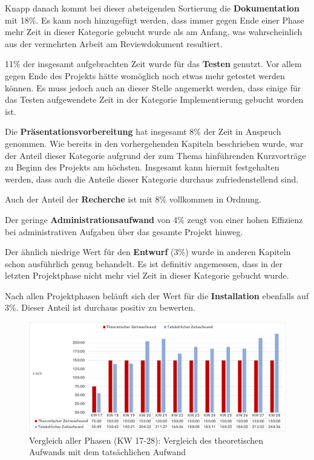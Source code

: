 \documentclass[../review_3.tex]{subfiles}
\begin{document}
Knapp danach kommt bei dieser absteigenden Sortierung die \textbf{Dokumentation} mit 18\%. Es kann noch hinzugefügt werden, dass immer gegen Ende einer Phase mehr Zeit in dieser Kategorie gebucht wurde als am Anfang, was wahrscheinlich aus der vermehrten Arbeit am Reviewdokument resultiert.

11\% der insgesamt aufgebrachten Zeit wurde für das \textbf{Testen} genutzt. Vor allem gegen Ende des Projekts hätte womöglich noch etwas mehr getestet werden können. Es muss jedoch auch an dieser Stelle angemerkt werden, dass einige für das Testen aufgewendete Zeit in der Kategorie Implementierung gebucht worden ist.

Die \textbf{Präsentationsvorbereitung} hat insgesamt 8\% der Zeit in Anspruch genommen. Wie bereits in den vorhergehenden Kapiteln beschrieben wurde, war der Anteil dieser Kategorie aufgrund der zum Thema hinführenden Kurzvorträge zu Beginn des Projekts am höchsten. Insgesamt kann hiermit festgehalten werden, dass auch die Anteile dieser Kategorie durchaus zufriedenstellend sind.

Auch der Anteil der \textbf{Recherche} ist mit 8\% vollkommen in Ordnung.

Der geringe \textbf{Administrationsaufwand} von 4\% zeugt von einer hohen Effizienz bei administrativen Aufgaben über das gesamte Projekt hinweg.

Der ähnlich niedrige Wert für den \textbf{Entwurf} (3\%) wurde in anderen Kapiteln schon ausführlich genug behandelt. Es ist definitiv angemessen, dass in der letzten Projektphase nicht mehr viel Zeit in dieser Kategorie gebucht wurde.

Nach allen Projektphasen beläuft sich der Wert für die \textbf{Installation} ebenfalls auf 3\%. Dieser Anteil ist durchaus positiv zu bewerten.

\begin{figure} [h]
    \centering
    \includegraphics[width = \linewidth, trim=5pt 5pt 5pt 5pt, clip]{img/allephasen.pdf}
    \caption{Vergleich aller Phasen (KW 17-28): Vergleich des theoretischen Aufwands mit dem tatsächlichen Aufwand}
    \label{kimai15}
\end{figure}
\end{document}
